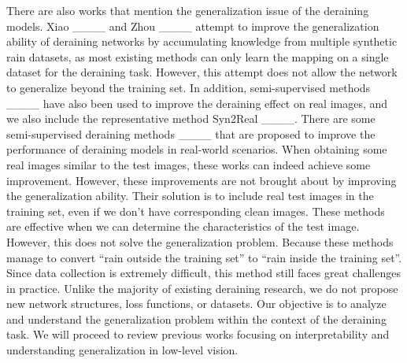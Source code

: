 There are also works that mention the generalization issue of the deraining models.
%
Xiao \etal ____ and Zhou \etal ____ attempt to improve the generalization ability of deraining networks by accumulating knowledge from multiple synthetic rain datasets, as most existing methods can only learn the mapping on a single dataset for the deraining task.
%
However, this attempt does not allow the network to generalize beyond the training set.
%
In addition, semi-supervised methods ____ have also been used to improve the deraining effect on real images, and we also include the representative method Syn2Real ____.
%
There are some semi-supervised deraining methods ____ that are proposed to improve the performance of deraining models in real-world scenarios.
%
When obtaining some real images similar to the test images, these works can indeed achieve some improvement. 
%
However, these improvements are not brought about by improving the generalization ability.
%
Their solution is to include real test images in the training set, even if we don't have corresponding clean images. 
%
These methods are effective when we can determine the characteristics of the test image. 
%
However, this does not solve the generalization problem. 
%
Because these methods manage to convert ``rain outside the training set'' to ``rain inside the training set''. 
%
Since data collection is extremely difficult, this method still faces great challenges in practice.
%
Unlike the majority of existing deraining research, we do not propose new network structures, loss functions, or datasets.
%
Our objective is to analyze and understand the generalization problem within the context of the deraining task.
%
We will proceed to review previous works focusing on interpretability and understanding generalization in low-level vision.


